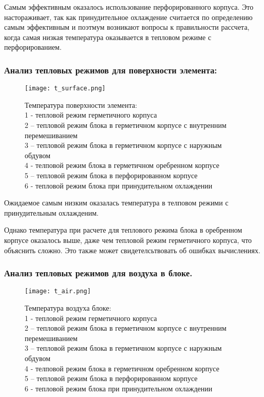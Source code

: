 Самым эффективным оказалось использование перфорированного корпуса.
Это настораживает, так как принудительное охлаждение считается по
определению самым эффективным и поэтмум возникают вопросы
к правильности рассчета, когда самая низкая температура оказывается в
тепловом режиме с перфорированием.\\


\subsubsection{Анализ тепловых режимов для поверхности элемента:}
\begin{figure}[h] %
\begin{center}
  \texttt{[image: t\_surface.png]}
  \end{center}
\caption{Температура поверхности элемента:\\
  1 - тепловой режим герметичного корпуса\\
  2 – тепловой режим блока в герметичном корпусе с внутренним перемешиванием\\
  3 – тепловой режим блока в герметичном корпусе с наружным обдувом\\
  4 - телповой режим блока в  герметичном оребренном корпусе \\
  5 – тепловой режим блока в перфорированном корпусе \\
  6 - тепловой режим блока при принудительном охлаждении}

\end{figure}

Ожидаемое самым низким оказалась температура в телповом режими с
принудительным охлажденим.

Однако температура при расчете для
теплового режима блока в оребренном корпусе оказалось выше, даже чем
тепловой режим герметичного корпуса, что объяснить сложно. Это также
может свидетелсьтвовать об ошибках вычислениях.

\subsubsection{Анализ тепловых режимов для воздуха в блоке.}
\begin{figure}[h] %
\begin{center}
  \texttt{[image: t\_air.png]}
  \end{center}
\caption{Температура воздуха блоке:\\
  1 - тепловой режим герметичного корпуса\\
  2 – тепловой режим блока в герметичном корпусе с внутренним перемешиванием\\
  3 – тепловой режим блока в герметичном корпусе с наружным обдувом\\
  4 - телповой режим блока в  герметичном оребренном корпусе \\
  5 – тепловой режим блока в перфорированном корпусе \\
  6 - тепловой режим блока при принудительном охлаждении}

\end{figure}

